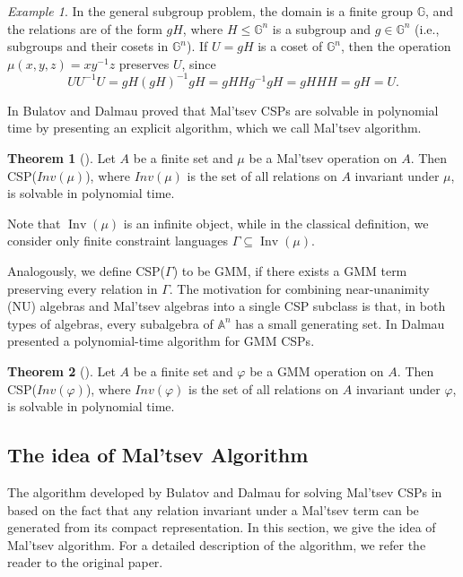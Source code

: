 \documentclass{article}
\theoremstyle{definition}
\theoremstyle{theorem}
\newtheorem{thm}{Theorem}
\theoremstyle{theorem}
\theoremstyle{remark}
\theoremstyle{remark}
\theoremstyle{example}
\newtheorem{ex}{Example}
\theoremstyle{notation}
\theoremstyle{theorem}
\begin{document}
\begin{ex}
    In the general subgroup problem, the domain is a finite group $\mathbb{G}$, and the relations are of the form $gH$, where $H \leq \mathbb{G}^n$ is a subgroup and $g \in \mathbb{G}^n$ (i.e., subgroups and their cosets in $\mathbb{G}^n$). If $U = gH$ is a coset of $\mathbb{G}^n$, then the operation $\mu(x, y, z) = xy^{-1}z$ preserves $U$, since
$$
UU^{-1}U = gH(gH)^{-1}gH = gH H g^{-1} gH = g H H H = gH = U.
$$
\end{ex}

In \cite{articlestdfh} Bulatov and Dalmau proved that Mal'tsev CSPs are solvable in polynomial time by presenting an explicit algorithm, which we call Mal'tsev algorithm. 
\begin{thm}[\cite{articlestdfh}]
    Let $A$ be a finite set and $\mu$ be a Mal’tsev operation on $A$. Then CSP($Inv(\mu)$), where $Inv(\mu)$ is the set of all relations on $A$ invariant under $\mu$, is solvable in polynomial time.
\end{thm}
Note that $\operatorname{Inv}(\mu)$ is an infinite object, while in the classical definition, we consider only finite constraint languages $\Gamma \subseteq \operatorname{Inv}(\mu)$. 

Analogously, we define CSP($\Gamma$) to be GMM, if there exists a GMM term preserving every relation in $\Gamma$. The motivation for combining near-unanimity (NU) algebras and Mal'tsev algebras into a single CSP subclass is that, in both types of algebras, every subalgebra of $\mathbb{A}^n$ has a small generating set. In \cite{lmcs:2237} Dalmau presented a polynomial-time algorithm for GMM CSPs. 

\begin{thm}[\cite{lmcs:2237}]
    Let $A$ be a finite set and $\varphi$ be a GMM operation on $A$. Then CSP($Inv(\varphi)$), where $Inv(\varphi)$ is the set of all relations on $A$ invariant under $\varphi$, is solvable in polynomial time.
\end{thm}

\subsection{The idea of Mal'tsev Algorithm}\label{al;sdkgh;lggggg}

The algorithm developed by Bulatov and Dalmau for solving Mal'tsev CSPs in \cite{doi:10.1137/050628957} based on the fact that any relation invariant under a Mal’tsev term can be generated from its compact representation. In this section, we give the idea of Mal'tsev algorithm. For a detailed description of the algorithm, we refer the reader to the original paper. 
\end{document}
